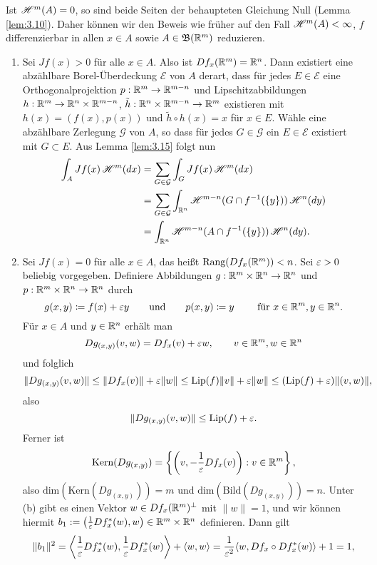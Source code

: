 \documentclass[a4paper,twoside,DIV15,BCOR12mm]{scrbook}
\newcommand{\borel}{\mathfrak B}
\newcommand{\HM}{\H}
\begin{document}
\begin{beweis}
Ist $\HM^m(A) = 0$, so sind beide Seiten der behaupteten Gleichung Null (Lemma \ref{lem:3.10}). Daher können wir den Beweis wie früher auf den Fall $\HM^m(A)<\infty$, $f$ differenzierbar in allen $x\in A$ sowie $A\in \borel(\MdR^m)$ reduzieren.
\begin{enumerate}[\quad(a)]
\item Sei $Jf(x) > 0$ für alle $x\in A$. Also ist $Df_x(\mathbb{R}^m) = \mathbb{R}^n$. Dann existiert eine abzählbare Borel-Überdeckung $\mathcal E$ von $A$ derart, dass für jedes $E\in\mathcal E$ eine Orthogonalprojektion $p:\mathbb{R}^m\to\mathbb{R}^{m-n}$ und Lipschitzabbildungen $h:\mathbb{R}^m\to\mathbb{R}^n\times\mathbb{R}^{m-n}$, $\tilde h:\mathbb{R}^n\times\mathbb{R}^{m-n}\to \mathbb{R}^m$ existieren mit $h(x) = (f(x), p(x))$ und $\tilde h \circ h (x) = x$ für $x\in E$. Wähle eine abzählbare Zerlegung $\mathcal G$ von $A$, so dass für jedes $G\in\mathcal G$ ein $E\in\mathcal E$ existiert mit $G\subset E$. Aus Lemma \ref{lem:3.15} folgt nun
\begin{align*}
\int_A Jf(x) \,\HM^m(dx) 
&= \sum_{G\in\mathcal G} \int_G Jf(x) \, \HM^m(dx) \\
&= \sum_{G\in\mathcal G} \int_{\MdR^n} \HM^{m-n}(G \cap f^{-1}(\{y\})) \, \HM^n(dy) \\
&= \int_{\MdR^n} \HM^{m-n}( A \cap f^{-1}(\{y\}))\, \HM^n(dy).
\end{align*}
\item Sei  $Jf(x) = 0$ für alle $x\in A$, das heißt $\text{Rang}(Df_x(\mathbb{R}^m))<n$. Sei $\varepsilon>0$ beliebig 
vorgegeben. Definiere Abbildungen $g:\mathbb{R}^m\times \mathbb{R}^n\to\mathbb{R}^n$ und $p:\mathbb{R}^m\times \mathbb{R}^n\to\mathbb{R}^n$ durch
$$
g(x,y)\da f(x)+\ep y\qquad\text{und}\qquad p(x,y)\da y\qquad \text{ für } x\in\MdR^m, y\in \MdR^n.
$$
Für $x\in A$ und $y\in \mathbb{R}^n$ erhält man
$$
Dg_{(x,y)}(v,w)=Df_x(v)+\varepsilon w,\qquad v\in\mathbb{R}^m, w\in \mathbb{R}^n
$$
und folglich
$$
\| Dg_{(x,y)}(v,w)\|\le \|Df_x(v)\|+\varepsilon \|w\|\le \text{Lip}(f)\|v\|+\varepsilon\|w\|\le (\text{Lip}(f)+\varepsilon)\|(v,w)\|,
$$
also 
$$
\| Dg_{(x,y)}(v,w)\|\le\text{Lip}(f)+\varepsilon.
$$
Ferner ist 
$$
\text{Kern}(Dg_{(x,y)})=\left\{ \left(v,-\frac{1}{\varepsilon}Df_x(v)\right):v\in \mathbb{R}^m\right\},
$$
also $\text{dim}(\text{Kern}(Dg_{(x,y)}))=m$ und $\text{dim}(\text{Bild}(Dg_{(x,y)}))=n$. 
Unter (b) gibt es einen Vektor $w\in Df_x(\mathbb{R}^m)^\perp$ mit $\|w\|=1$, und wir können hiermit 
$b_1:=\left(\frac{1}{\varepsilon}Df_x^*(w),w\right)\in\mathbb{R}^m\times\mathbb{R}^n$ definieren. Dann gilt
$$
\|b_1\|^2=\left\langle \frac{1}{\varepsilon}Df_x^*(w),\frac{1}{\varepsilon}Df_x^*(w)\right\rangle+\langle w,w\rangle=
\frac{1}{\varepsilon^2}\langle w,Df_x\circ Df_x^*(w)\rangle+1=1,
$$
\end{enumerate}
\end{beweis}
\end{document}
